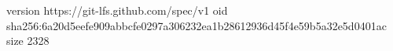 version https://git-lfs.github.com/spec/v1
oid sha256:6a20d5eefe909abbcfe0297a306232ea1b28612936d45f4e59b5a32e5d0401ac
size 2328
